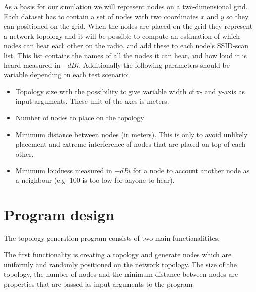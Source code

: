 As a basis for our simulation we will represent nodes on a two-dimensional grid. Each dataset has to contain a set of nodes with two coordinates $x$ and $y$ so they can
positioned on the grid. When the nodes are placed on the grid they represent a network topology
and it will be possible to compute an estimation of which nodes can hear each other on the radio, and add these to each node's SSID-scan list.
This list contains the names of all the nodes it can hear, and how loud it is heard measured in $-dBi$.
Additionally the following parameters should be variable depending on each test scenario:

\begin{itemize}
	\item Topology size with the possibility to give variable width of x- and y-axis as input arguments. These unit of the axes is meters.
	\item Number of nodes to place on the topology
	\item Minimum distance between nodes (in meters). This is only to avoid unlikely placement and extreme interference of nodes that are placed on top of each other. 
	\item Minimum loudness measured in $-dBi$ for a node to account another node as a neighbour (e.g -100 is too low for anyone to hear).
\end{itemize}


	\section{Program design}\label{prog_design}
	The topology generation program consists of two main functionalitites.

	The first functionality is creating a topology and generate nodes which are uniformly
	and randomly positioned on the network topology. The size of the topology, the number of nodes and the minimum distance
	between nodes are properties that are passed as input arguments to the program.

